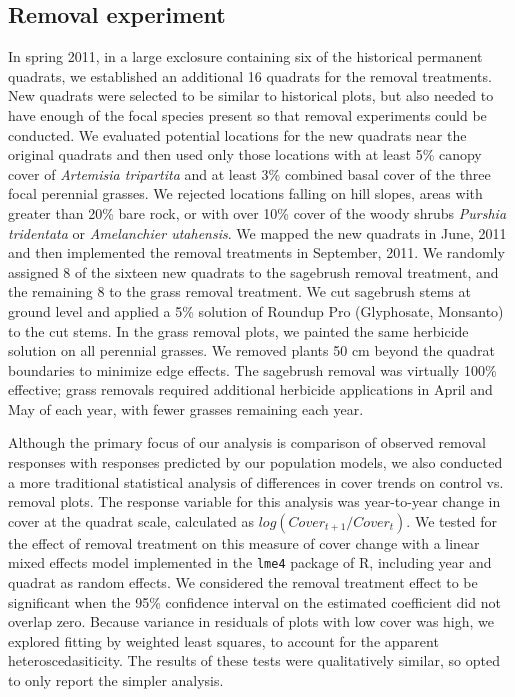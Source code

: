 \documentclass[11pt]{article}
\begin{document}
\begin{doublespacing}
\subsection*{Removal experiment}
In spring 2011, in a large exclosure containing six of the historical permanent quadrats, we established an additional 16 quadrats for the removal treatments. New quadrats were selected to be similar to historical plots, but also needed to have enough of the focal species present so that removal experiments could be conducted. We evaluated potential locations for the new quadrats near the original quadrats and then used only those locations with at least 5\% canopy cover of \textit{Artemisia tripartita} and at least 3\% combined basal cover of the three focal perennial grasses. We rejected locations falling on hill slopes, areas with greater than 20\% bare rock, or with over 10\% cover of the woody shrubs \textit{Purshia tridentata} or \textit{Amelanchier utahensis}. We mapped the new quadrats in June, 2011 and then implemented the removal treatments in September, 2011. We randomly assigned 8 of the sixteen new quadrats to the sagebrush removal treatment, and the remaining 8 to the grass removal treatment. We cut sagebrush stems at ground level and applied a 5\% solution of Roundup Pro (Glyphosate, Monsanto) to the cut stems. In the grass removal plots, we painted the same herbicide solution on all perennial grasses. We removed plants 50 cm beyond the quadrat boundaries to minimize edge effects. The sagebrush removal was virtually 100\% effective; grass removals required additional herbicide applications in April and May of each year, with fewer grasses remaining each year.

Although the primary focus of our analysis is comparison of observed removal responses with responses predicted by our population models, we also conducted a more traditional statistical analysis of differences in cover trends on control vs. removal plots. The response variable for this analysis was year-to-year change in cover at the quadrat scale, calculated as $log(Cover_{t+1}/Cover_t)$. We tested for the effect of removal treatment on this measure of cover change with a linear mixed effects model implemented in the \texttt{lme4} package \citep{Bates2015} of R, including year and quadrat as random effects. We considered the removal treatment effect to be significant when the 95\% confidence interval on the estimated coefficient did not overlap zero.  Because variance in residuals of plots with low cover was high, we explored fitting by weighted least squares, to account for the apparent heteroscedasiticity. The results of these tests were qualitatively similar, so opted to only report the simpler analysis.


\end{doublespacing}
\end{document}
